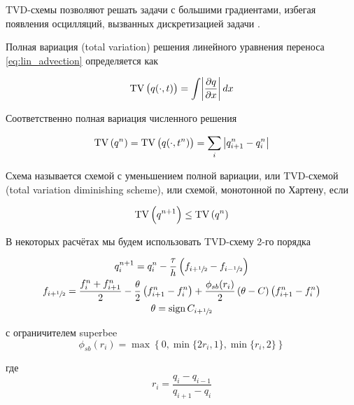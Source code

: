 TVD-схемы позволяют решать задачи с большими градиентами, избегая появления осцилляций, вызванных дискретизацией задачи \cite{harten} \cite{rus_tvd} \cite{petrov_lobanov_book}. 

Полная вариация (total variation) решения линейного уравнения переноса \eqref{eq:lin_advection} определяется как

\begin{equation*}
    \operatorname{TV} \left(q(\cdot, t)\right) = \int \abs{\dfrac{\partial q}{\partial x}} dx
\end{equation*}

Соответственно полная вариация численного решения 

\begin{equation*}
    \operatorname{TV} \left(q^n\right) = \operatorname{TV} \left(q(\cdot, t^n)\right) = \sum_i \left| q_{i+1}^n - q_i^n \right|
\end{equation*}

Схема называется схемой с уменьшением полной вариации, или TVD-схемой (total variation diminishing scheme), или схемой, монотонной по Хартену, если

\begin{equation*}
    \operatorname{TV} \left(q^{n+1}\right) \leq \operatorname{TV} \left(q^n\right)
\end{equation*}

В некоторых расчётах мы будем использовать TVD-схему 2-го порядка

\begin{equation}
\begin{gathered}
    q_i^{n+1} = q_i^n - \dfrac{\tau}{h}\left(f_{i+\sfrac{1}{2}} - f_{i-\sfrac{1}{2}}\right) \\
    f_{i+\sfrac{1}{2}} = \dfrac{f_i^n + f^n_{i+1}}{2} - \dfrac{\theta}{2}\left(f_{i+1}^n - f_i^n\right) + \dfrac{\phi_{sb}(r_i)}{2} \left(\theta - C\right) \left(f_{i+1}^n - f_i^n\right) \\
    \theta = \operatorname{sign} C_{i+\sfrac{1}{2}}
\end{gathered}
\label{eq:tvd_scheme}
\end{equation}

с ограничителем superbee
\begin{equation}
    \phi_{sb}(r_i) = \max \left\{0, \min\{2r_i,1\}, \min\{r_i,2\}\right\}
\end{equation}

где
\begin{equation*}
    r_i = \dfrac{q_i - q_{i-1}}{q_{i+1} - q_i}
\end{equation*}

